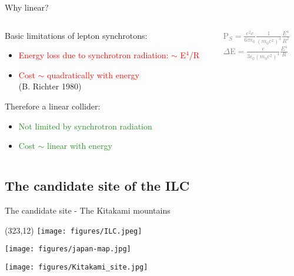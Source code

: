 \documentclass[xcolor={dvipsnames}]{beamer}
\newcommand{\ilclogo}{
  \setlength{\TPHorizModule}{1pt}
  \setlength{\TPVertModule}{1pt}
  \begin{textblock}{1}(323,12)
   \texttt{[image: figures/ILC.jpeg]}
  \end{textblock}
}
\begin{document}
\begin{frame}{Why linear?}
\begin{columns}
 \begin{column}{0.6\textwidth}
  Basic limitations of lepton synchrotons:
\begin{itemize}
 \item \textcolor{Red}{Energy loss due to synchrotron radiation: $\sim$ E$^4$/R}
 \item \textcolor{Red}{Cost $\sim$ quadratically with energy}\\ \tiny{(B. Richter 
1980)}
\end{itemize}
\vspace*{1cm}
Therefore a linear collider:
\begin{itemize}
 \item \textcolor{ForestGreen}{Not limited by synchrotron radiation}
 \item \textcolor{ForestGreen}{Cost $\sim$ linear with energy}
\end{itemize}
 \end{column}
 \begin{column}{0.4\textwidth}
 \begin{block}{}
  \begin{center}
      \textcolor{Gray}{P$_S=\frac{e^2c}{6\pi\epsilon_0}\frac{1}{(m_0c^2)^4}\frac{E^4}{R^2}$\\
  $\Delta$E$=\frac{e}{3\epsilon_0(m_0c^2)^4}\frac{E^4}{R}$}
   \end{center}
 \end{block}
 \end{column}
\end{columns}

\end{frame}

\subsection{The candidate site of the ILC}
\begin{frame}{The candidate site - The Kitakami mountains}
\ilclogo
\begin{center}
\begin{minipage}[t]{0.49\textwidth}
\centering
 \texttt{[image: figures/japan-map.jpg]}
\end{minipage}
\begin{minipage}[t]{0.48\textwidth}
\centering
   \texttt{[image: figures/Kitakami\_site.jpg]}
\end{minipage}
\end{center}
\end{frame}
\end{document}
